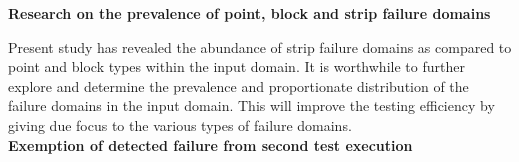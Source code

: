 

\textbf{Research on the prevalence of point, block and strip failure domains}

Present study has revealed the abundance of strip failure domains as compared to point and block types within the input domain. It is worthwhile to further explore and determine the prevalence and proportionate distribution of the failure domains in the input domain. This will improve the testing efficiency by giving due focus to the various types of failure domains.\\



\textbf{Exemption of detected failure from second test execution}

